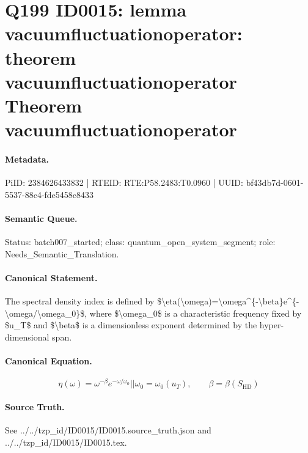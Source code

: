 \section*{Q199 ID0015: lemma vacuumfluctuationoperator: theorem vacuumfluctuationoperator Theorem vacuumfluctuationoperator}
\paragraph{Metadata.}
PiID: 2384626433832 | RTEID: RTE:P58.2483:T0.0960 | UUID: bf43db7d-0601-5537-88c4-fde5458c8433

\paragraph{Semantic Queue.}
Status: batch007\_started; class: quantum\_open\_system\_segment; role: Needs\_Semantic\_Translation.

\paragraph{Canonical Statement.}
The spectral density index is defined by \$\textbackslash{}eta(\textbackslash{}omega)=\textbackslash{}omega\textasciicircum{}\{-\textbackslash{}beta\}e\textasciicircum{}\{-\textbackslash{}omega/\textbackslash{}omega\_0\}\$, where \$\textbackslash{}omega\_0\$ is a characteristic frequency fixed by \$u\_T\$ and \$\textbackslash{}beta\$ is a dimensionless exponent determined by the hyper-dimensional span.

\paragraph{Canonical Equation.}
\[
\eta(\omega) = \omega^{-\beta} e^{-\omega/\omega_{0}} || \omega_{0} = \omega_{0}(u_{T}), \qquad \beta = \beta(S_{\mathrm{HD}})
\]

\paragraph{Source Truth.}
See ../../tzp\_id/ID0015/ID0015.source\_truth.json and ../../tzp\_id/ID0015/ID0015.tex.
